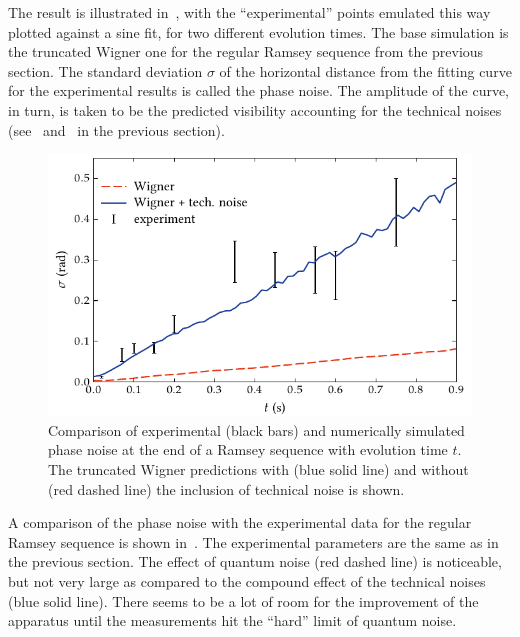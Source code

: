 The result is illustrated in~, with the ``experimental'' points emulated this way plotted against a sine fit, for two different evolution times.
The base simulation is the truncated Wigner one for the regular Ramsey sequence from the previous section.
The standard deviation $\sigma$ of the horizontal distance from the fitting curve for the experimental results is called the phase noise.
The amplitude of the curve, in turn, is taken to be the predicted visibility accounting for the technical noises (see~ and~ in the previous section).

\begin{figure}
    \centerline{\includegraphics{figures_generated/bec_noise/ramsey_noise.pdf}}

    \caption[Experimental and numerically simulated phase noise in Ramsey sequence]{
    Comparison of experimental (black bars) and numerically simulated phase noise at the end of a Ramsey sequence with evolution time $t$.
    The truncated Wigner predictions with (blue solid line) and without (red dashed line) the inclusion of technical noise is shown.}%

    \label{fig:bec-noise:phase-noise:ramsey-phnoise}
\end{figure}

A comparison of the phase noise with the experimental data for the regular Ramsey sequence is shown in~.
The experimental parameters are the same as in the previous section.
The effect of quantum noise (red dashed line) is noticeable, but not very large as compared to the compound effect of the technical noises (blue solid line).
There seems to be a lot of room for the improvement of the apparatus until the measurements hit the ``hard'' limit of quantum noise.

